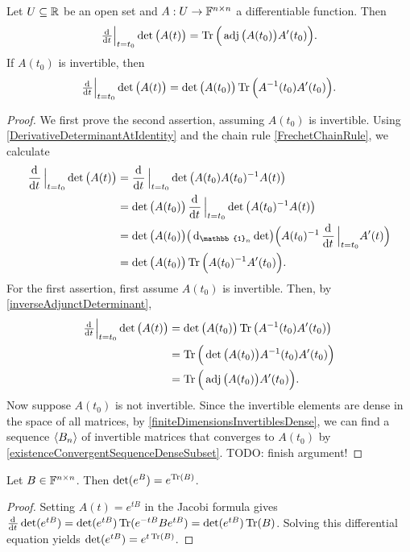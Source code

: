 \begin{proposition} \label{JacobisFormula}
Let $U\subseteq \mathbb{R}$ be an open set and $A: U\to \mathbb{F}^{n\times n}$ a differentiable function. Then
\[ \od{}{t}\Big|_{t=t_0}\det\big(A(t)\big) = \Tr\Big(\adj\big(A(t_0)\big)A'(t_0)\Big). \]
If $A(t_0)$ is invertible, then
\[ \od{}{t}\Big|_{t=t_0}\det\big(A(t)\big) = \det\big(A(t_0)\big)\Tr\Big(A^{-1}(t_0)A'(t_0)\Big). \]
\end{proposition}
\begin{proof}
We first prove the second assertion, assuming $A(t_0)$ is invertible. Using \ref{DerivativeDeterminantAtIdentity} and the chain rule \ref{FrechetChainRule}, we calculate
\begin{align*}
\dod{}{t}\Big|_{t=t_0}\det\big(A(t)\big) &= \dod{}{t}\Big|_{t=t_0}\det\big(A(t_0)A(t_0)^{-1}A(t)\big) \\
&= \det\big(A(t_0)\big)\dod{}{t}\Big|_{t=t_0}\det\big(A(t_0)^{-1}A(t)\big) \\
&= \det\big(A(t_0)\big)\big(\diff{_{\mathbb{1}_n}\det}\big)\Big(A(t_0)^{-1}\dod{}{t}\Big|_{t=t_0}A'(t)\Big) \\
&= \det\big(A(t_0)\big)\Tr\Big(A(t_0)^{-1}A'(t_0)\Big).
\end{align*}
For the first assertion, first assume $A(t_0)$ is invertible. Then, by \ref{inverseAdjunctDeterminant},
\begin{align*}
\od{}{t}\Big|_{t=t_0}\det\big(A(t)\big) &= \det\big(A(t_0)\big)\Tr\big(A^{-1}(t_0)A'(t_0)\big) \\
&= \Tr\Big(\det\big(A(t_0)\big)A^{-1}(t_0)A'(t_0)\Big) \\
&= \Tr\Big(\adj\big(A(t_0)\big)A'(t_0)\Big).
\end{align*}
Now suppose $A(t_0)$ is not invertible. Since the invertible elements are dense in the space of all matrices, by \ref{finiteDimensionsInvertiblesDense}, we can find a sequence $\left\langle B_n \right\rangle$ of invertible matrices that converges to $A(t_0)$ by \ref{existenceConvergentSequenceDenseSubset}. TODO: finish argument!
\end{proof}
\begin{corollary}
Let $B\in \mathbb{F}^{n\times n}$. Then $\det(e^{B}) = e^{\operatorname{Tr}(B)}$.
\end{corollary}
\begin{proof}
Setting $A(t) = e^{t B}$ in the Jacobi formula gives $\od{}{t}\det(e^{tB}) = \det(e^{tB})\Tr(e^{-tB}Be^{tB}) = \det(e^{tB})\Tr(B)$. Solving this differential equation yields $\det(e^{tB}) = e^{t\operatorname{Tr}(B)}$.
\end{proof}

